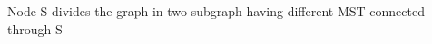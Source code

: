 \documentclass[preview]{standalone}
\begin{document}
\begin{center}
Node S divides the graph in two subgraph having different MST connected through S
\end{center}
\end{document}
